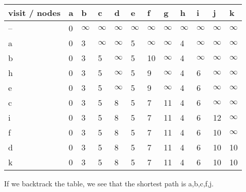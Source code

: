 \documentclass[12pt]{article}
\begin{document}
\begin{table}[h!]
\begin{center}
\begin{tabular}{|l|l|l|l|l|l|l|l|l|l|l|l|}
\hline
visit / nodes & a & b                & c                & d                & e                & f                & g                & h                & i                & j                & k                \\ \hline
--          & 0 & $\infty$ & $\infty$ & $\infty$ & $\infty$ & $\infty$ & $\infty$ & $\infty$ & $\infty$ & $\infty$ & $\infty$ \\ \hline
a             & 0 & 3                & $\infty$ & $\infty$ & 5                & $\infty$ & $\infty$ & 4                & $\infty$ & $\infty$ & $\infty$ \\ \hline
b             & 0 & 3                & 5                & $\infty$ & 5                & 10               & $\infty$ & 4                & $\infty$ & $\infty$ & $\infty$ \\ \hline
h             & 0 & 3                & 5                & $\infty$ & 5                & 9                & $\infty$ & 4                & 6                & $\infty$ & $\infty$ \\ \hline
e             & 0 & 3                & 5                & $\infty$ & 5                & 9                & $\infty$ & 4                & 6                & $\infty$ & $\infty$ \\ \hline
c             & 0 & 3                & 5                & 8                & 5                & 7                & 11               & 4                & 6                & $\infty$ & $\infty$ \\ \hline
i             & 0 & 3                & 5                & 8                & 5                & 7                & 11               & 4                & 6                & 12               & $\infty$ \\ \hline
f             & 0 & 3                & 5                & 8                & 5                & 7                & 11               & 4                & 6                & 10               & $\infty$ \\ \hline
d             & 0 & 3                & 5                & 8                & 5                & 7                & 11               & 4                & 6                & 10               & 10               \\ \hline
k             & 0 & 3                & 5                & 8                & 5                & 7                & 11               & 4                & 6                & 10               & 10               \\ \hline
\end{tabular}
\end{center}
\end{table}
\begin{center}
If we backtrack the table, we see that the shortest path is a,b,c,f,j.
\end{center}
\end{document}
